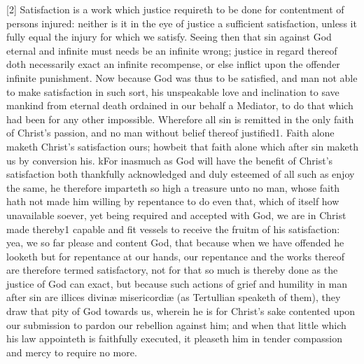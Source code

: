 [2] Satisfaction is a work which justice requireth to be done for contentment of persons injured: neither is it in the eye of justice a sufficient satisfaction, unless it fully equal the injury for which we satisfy. Seeing then that sin against God eternal and infinite must needs be an infinite wrong; justice in regard thereof doth necessarily exact an infinite recompense, or else inflict upon the offender infinite punishment. Now because God was thus to be satisfied, and man not able to make satisfaction in such sort, his unspeakable love and inclination to save mankind from eternal death ordained in our behalf a Mediator, to do that which had been for any other impossible. Wherefore all sin is remitted in  the only faith of Christ’s passion, and no man without belief thereof justified1. Faith alone maketh Christ’s satisfaction ours; howbeit that faith alone which after sin maketh us by conversion his. kFor inasmuch as God will have the benefit of Christ’s satisfaction both thankfully acknowledged and duly esteemed of all such as enjoy the same, he therefore imparteth so high a treasure unto no man, whose faith hath not made him willing by repentance to do even that, which of itself how unavailable soever, yet being required and accepted with God, we are in Christ made thereby1 capable and fit vessels to receive the fruitm of his satisfaction: yea, we so far please and content God, that because when we have offended he looketh but for repentance at our hands, our repentance and the works thereof are therefore termed satisfactory, not for that so much is thereby done as the justice of God can exact, but because such actions of grief and humility in man after sin are illices divinæ misericordiæ (as Tertullian speaketh of them), they draw that pity of God towards us, wherein he is for Christ’s sake contented upon our submission to pardon our rebellion against him; and when that little which his law appointeth is faithfully executed, it pleaseth him in tender compassion and mercy to require no more.

